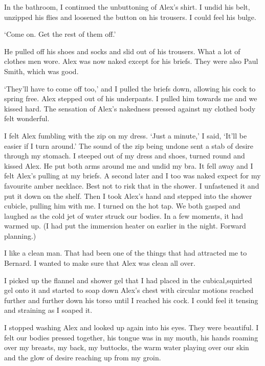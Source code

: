 In the bathroom, I continued the unbuttoning of Alex's shirt. I
undid his belt, unzipped his flies and loosened the button on his
trousers. I could feel his bulge.

`Come on. Get the rest of them off.'

He pulled off his shoes and socks and slid out of his trousers. What
a lot of clothes men wore. Alex was now naked except for his briefs.
They were also Paul Smith, which was good.

`They'll have to come off too,' and I pulled the briefs down,
allowing his cock to spring free. Alex stepped out of his
underpants. I pulled him towards me and we kissed hard. The
sensation of Alex's nakedness pressed against my clothed body felt
wonderful.

I felt Alex fumbling with the zip on my dress. `Just a minute,' I
said, `It'll be easier if I turn around.' The sound of the zip being
undone sent a stab of desire through my stomach. I steeped out of my
dress and shoes, turned round and kissed Alex. He put both arms
around me and undid my bra. It fell away and I felt Alex's pulling
at my briefs. A second later and I too was naked expect for my
favourite amber necklace. Best not to risk that in the shower. I
unfastened it and put it down on the shelf. Then I took Alex's hand
and stepped into the shower cubicle, pulling him with me. I turned
on the hot tap. We both gasped and laughed as the cold jet of water
struck our bodies. In a few moments, it had warmed up. (I had put
the immersion heater on earlier in the night. Forward planning.)

I like a {\twelveit clean\/} man. That had been one of the things
that had attracted me to Bernard. I wanted to make sure that Alex
was clean all over.

I picked up the flannel and shower gel that I had placed in the
cubical,squirted gel onto it and started to soap down Alex's chest
with circular motions reached further and further down his torso
until I reached his cock. I could feel it tensing and straining as I
soaped it.

I stopped washing Alex and looked up again into his eyes. They were
beautiful. I felt our bodies pressed together, his tongue was in my
mouth, his hands roaming over my breasts, my back, my buttocks, the
warm water playing over our skin and the glow of desire reaching up
from my groin. \vfill\eject
